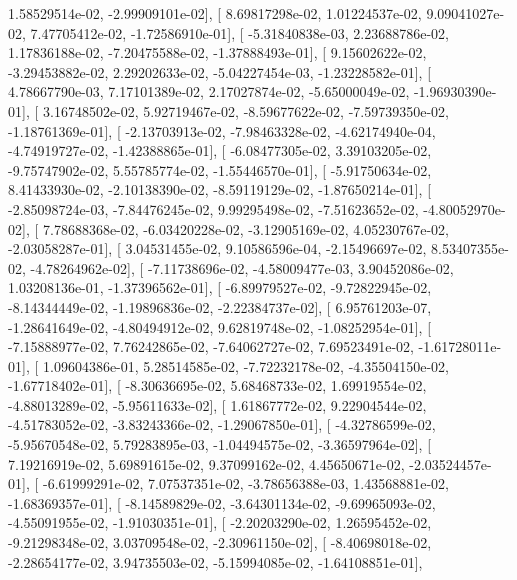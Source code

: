 \documentclass{article}
\begin{document}
          1.58529514e-02,  -2.99909101e-02],
       [  8.69817298e-02,   1.01224537e-02,   9.09041027e-02,
          7.47705412e-02,  -1.72586910e-01],
       [ -5.31840838e-03,   2.23688786e-02,   1.17836188e-02,
         -7.20475588e-02,  -1.37888493e-01],
       [  9.15602622e-02,  -3.29453882e-02,   2.29202633e-02,
         -5.04227454e-03,  -1.23228582e-01],
       [  4.78667790e-03,   7.17101389e-02,   2.17027874e-02,
         -5.65000049e-02,  -1.96930390e-01],
       [  3.16748502e-02,   5.92719467e-02,  -8.59677622e-02,
         -7.59739350e-02,  -1.18761369e-01],
       [ -2.13703913e-02,  -7.98463328e-02,  -4.62174940e-04,
         -4.74919727e-02,  -1.42388865e-01],
       [ -6.08477305e-02,   3.39103205e-02,  -9.75747902e-02,
          5.55785774e-02,  -1.55446570e-01],
       [ -5.91750634e-02,   8.41433930e-02,  -2.10138390e-02,
         -8.59119129e-02,  -1.87650214e-01],
       [ -2.85098724e-03,  -7.84476245e-02,   9.99295498e-02,
         -7.51623652e-02,  -4.80052970e-02],
       [  7.78688368e-02,  -6.03420228e-02,  -3.12905169e-02,
          4.05230767e-02,  -2.03058287e-01],
       [  3.04531455e-02,   9.10586596e-04,  -2.15496697e-02,
          8.53407355e-02,  -4.78264962e-02],
       [ -7.11738696e-02,  -4.58009477e-03,   3.90452086e-02,
          1.03208136e-01,  -1.37396562e-01],
       [ -6.89979527e-02,  -9.72822945e-02,  -8.14344449e-02,
         -1.19896836e-02,  -2.22384737e-02],
       [  6.95761203e-07,  -1.28641649e-02,  -4.80494912e-02,
          9.62819748e-02,  -1.08252954e-01],
       [ -7.15888977e-02,   7.76242865e-02,  -7.64062727e-02,
          7.69523491e-02,  -1.61728011e-01],
       [  1.09604386e-01,   5.28514585e-02,  -7.72232178e-02,
         -4.35504150e-02,  -1.67718402e-01],
       [ -8.30636695e-02,   5.68468733e-02,   1.69919554e-02,
         -4.88013289e-02,  -5.95611633e-02],
       [  1.61867772e-02,   9.22904544e-02,  -4.51783052e-02,
         -3.83243366e-02,  -1.29067850e-01],
       [ -4.32786599e-02,  -5.95670548e-02,   5.79283895e-03,
         -1.04494575e-02,  -3.36597964e-02],
       [  7.19216919e-02,   5.69891615e-02,   9.37099162e-02,
          4.45650671e-02,  -2.03524457e-01],
       [ -6.61999291e-02,   7.07537351e-02,  -3.78656388e-03,
          1.43568881e-02,  -1.68369357e-01],
       [ -8.14589829e-02,  -3.64301134e-02,  -9.69965093e-02,
         -4.55091955e-02,  -1.91030351e-01],
       [ -2.20203290e-02,   1.26595452e-02,  -9.21298348e-02,
          3.03709548e-02,  -2.30961150e-02],
       [ -8.40698018e-02,  -2.28654177e-02,   3.94735503e-02,
         -5.15994085e-02,  -1.64108851e-01],
\end{document}
